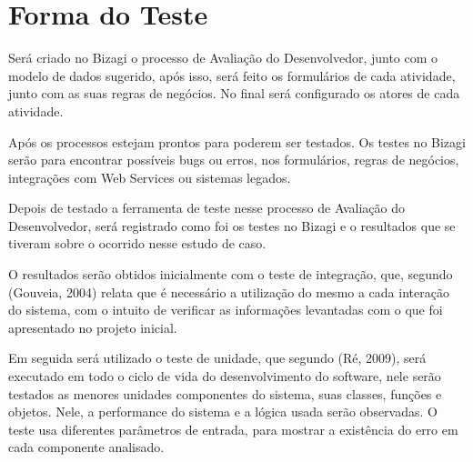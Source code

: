 




\section{Forma do Teste}
\label{chap:Forma-do-teste}
Será criado no Bizagi o processo de Avaliação do Desenvolvedor, junto com o modelo de dados sugerido, após isso, será feito os formulários de cada atividade, junto com as suas regras de negócios. No final será configurado os atores de cada atividade. 


Após os processos estejam prontos para poderem ser testados. Os testes no Bizagi serão para encontrar possíveis bugs ou erros, nos formulários, regras de negócios, integrações com Web Services ou sistemas legados.

Depois de testado a ferramenta de teste nesse processo de Avaliação do Desenvolvedor, será registrado como foi os testes no Bizagi e o resultados que se tiveram sobre o ocorrido nesse estudo de caso.

O resultados serão obtidos inicialmente com o teste de integração, que, segundo (Gouveia, 2004) relata que é necessário a utilização do mesmo a cada interação do sistema, com o intuito de verificar as informações levantadas com o que foi apresentado no projeto inicial.

Em seguida será utilizado o teste de unidade, que segundo (Ré, 2009), será executado em todo o ciclo de vida do desenvolvimento do software, nele serão testados as menores unidades componentes do sistema, suas classes, funções e objetos. Nele, a performance do sistema e a lógica usada serão observadas. O teste usa diferentes parâmetros de entrada, para mostrar a existência do erro em cada componente analisado.

